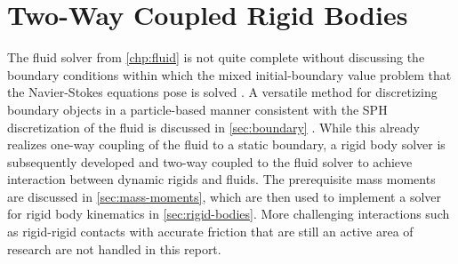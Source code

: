 \documentclass[oneside, a4paper]{book}
\newcommand\br[1]{\left(#1\right)}
\begin{document}
    
    



\chapter{Two-Way Coupled Rigid Bodies}\label{chp:rigid}
    The fluid solver from \autoref{chp:fluid} is not quite complete without discussing the boundary conditions within which the mixed initial-boundary value problem that the Navier-Stokes equations pose is solved \autocite{tutorial2019}. A versatile method for discretizing boundary objects in a particle-based manner consistent with the SPH discretization of the fluid is discussed in \autoref{sec:boundary} \autocite{versatile-boundary-akinci}. While this already realizes one-way coupling of the fluid to a static boundary, a rigid body solver is subsequently developed and two-way coupled to the fluid solver to achieve interaction between dynamic rigids and fluids. The prerequisite mass moments are discussed in \autoref{sec:mass-moments}, which are then used to implement a solver for rigid body kinematics in \autoref{sec:rigid-bodies}. More challenging interactions such as rigid-rigid contacts with accurate friction that are still an active area of research \autocite{monolithic-rigids-timo} are not handled in this report.
\end{document}
